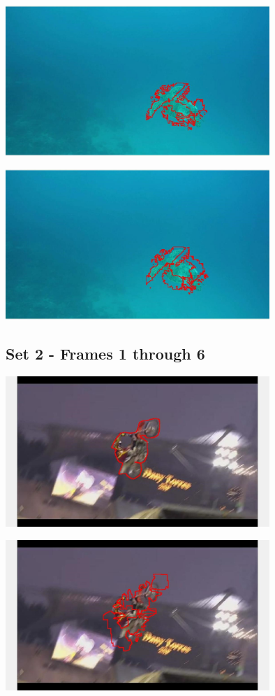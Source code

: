 \documentclass{article}
\begin{document}
	\begin{center}
		\includegraphics[width=100mm]{img/a5}
	\end{center}

	\begin{center}
		\includegraphics[width=100mm]{img/a6}
	\end{center}

	\subsection{Set 2 - Frames 1 through 6}
	
	\begin{center}
		\includegraphics[width=100mm]{img/b1}
	\end{center}
	
	\begin{center}
		\includegraphics[width=100mm]{img/b2}
	\end{center}
	
\end{document}
